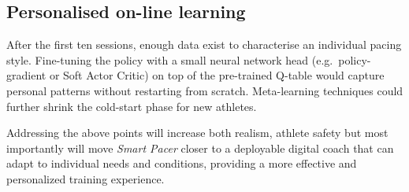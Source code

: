 \subsection{Personalised on-line learning}
After the first ten sessions, enough data exist to characterise an individual pacing style.  Fine-tuning the policy with a small neural network head (e.g.\ policy-gradient or Soft Actor Critic) on top of the pre-trained Q-table would capture personal patterns without restarting from scratch.  
Meta-learning techniques could further shrink the cold-start phase for new athletes.


\bigskip
Addressing the above points will increase both realism, athlete safety but most importantly will move \emph{Smart Pacer} closer to a deployable digital coach that can adapt to individual needs and conditions, providing a more effective and personalized training experience.